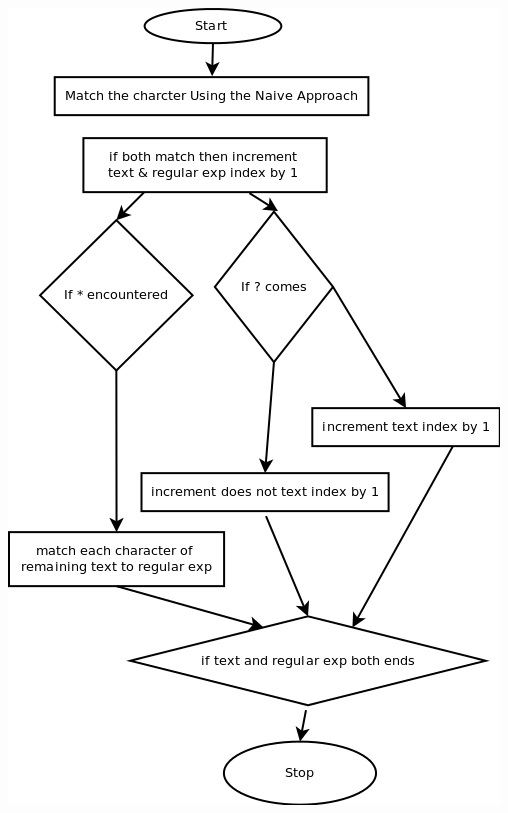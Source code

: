 \documentclass[a4paper,12pt]{report}
\begin{document}
\begin{center}
 \includegraphics[width=15 cm,height=15 cm]{./flowchart2.png}
\end{center}
\end{document}
